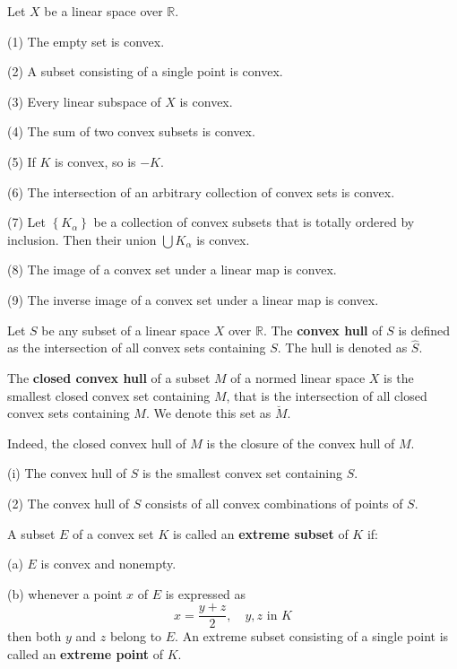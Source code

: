 \documentclass[12pt, oneside]{book}
\begin{document}
\begin{theorem}
    Let $X$ be a linear space over $\mathbb{R}$.

    (1) The empty set is convex.

    (2) A subset consisting of a single point is convex.

    (3) Every linear subspace of $X$ is convex.

    (4) The sum of two convex subsets is convex.

    (5) If $K$ is convex, so is $-K$.

    (6) The intersection of an arbitrary collection of convex sets is convex.

    (7) Let $\left\{K_\alpha\right\}$ be a collection of convex subsets that is totally ordered by inclusion. Then their union $\bigcup K_\alpha$ is convex.

    (8) The image of a convex set under a linear map is convex.

    (9) The inverse image of a convex set under a linear map is convex.
\end{theorem}

\begin{definition}
    Let $S$ be any subset of a linear space $X$ over $\mathbb{R}$. The \textbf{convex hull} of $S$ is defined as the intersection of all convex sets containing $S$. The hull is denoted as $\widehat{S}$.
\end{definition}


\begin{definition}
    The \textbf{closed convex hull} of a subset $M$ of a normed linear space $X$ is the smallest closed convex set containing $M$, that is the intersection of all closed convex sets containing $M$. We denote this set as $\breve{M}$.

    Indeed, the closed convex hull of $M$ is the closure of the convex hull of $M$.
\end{definition}


\begin{theorem}


    (i) The convex hull of $S$ is the smallest convex set containing $S$.

    (2) The convex hull of $S$ consists of all convex combinations of points of $S$.
\end{theorem}
\begin{definition}
    A subset $E$ of a convex set $K$ is called an \textbf{extreme subset} of $K$ if:

    (a) $E$ is convex and nonempty.

    (b) whenever a point $x$ of $E$ is expressed as
    \begin{equation*}
        x=\frac{y+z}{2}, \quad y, z \text { in } K
    \end{equation*}
    then both $y$ and $z$ belong to $E$.
    An extreme subset consisting of a single point is called an \textbf{extreme point} of $K$.
\end{definition}
\end{document}
